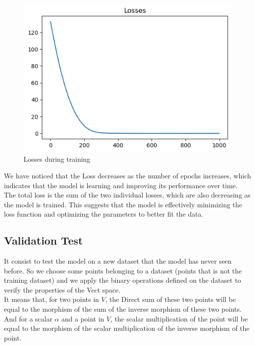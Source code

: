 \documentclass{report}
\begin{document}
        \begin{figure}[h]
            \centering
            \includegraphics[width=\textwidth]{./images/losses.png}
            \caption{Losses during training}
            \label{fig:losses}
        \end{figure}

            \newpage


            We have noticed that the Loss decreases as the number of epochs increases, which indicates that the model is learning and improving its performance over time. The total loss is the sum of the two individual losses, which are also decreasing as the model is trained. This suggests that the model is effectively minimizing the loss function and optimizing the parameters to better fit the data.

        \subsection{Validation Test}

            It consist to test the model on a new dataset that the model has never seen before. So we choose some points belonging to a dataset (points that is not the training dataset) and we apply the binary operations defined on the dataset to verify the properties of the Vect space. \\
            It means that, for two points in $V$, the Direct sum of these two points will be equal to the morphism of the sum of the inverse morphism of these two points. And for a scalar $\alpha$ and a point in $V$, the scalar multiplication of the point will be equal to the morphism of the scalar multiplication of the inverse morphism of the point.
\end{document}
